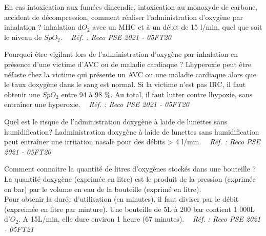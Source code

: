 \documentclass[grid,avery5371,landscape]{flashcards}
\makeatletter
\newcounter{nocarte}
\newcommand{\categ}[1]{%
  \def\@categ{#1}%
  \setcounter{nocarte}{0}%
}
\newcommand{\source}[1]{%
  \medskip
  \itshape%
   ~ \hfill Réf. : #1}
\makeatother
\begin{document}
\color[HTML]{003273}
\categ{PSE}
\begin{flashcard}[CAT]{
 En cas intoxication aux fumées dincendie, intoxication au monoxyde de carbone, accident de décompression, comment réaliser l'administration d'oxygène par inhalation ?   }
  inhalation d$O_2$ avec un MHC et à un débit de 15 l/min, quel que soit le niveau de $SpO_2$.
  \source{Reco PSE 2021 - 05FT20}
\end{flashcard}


\color[HTML]{003273}
\categ{PSE}
\begin{flashcard}[CAT]{
 Pourquoi être vigilant lors de l'administration d'oxygène par inhalation en présence d'une victime d'AVC ou de maladie cardiaque ?   }
  Lhyperoxie peut être néfaste chez la victime qui présente un AVC ou une maladie cardiaque alors que le taux doxygène dans le sang est normal. Si la victime n'est pas IRC, il faut obtenir une $SpO_2$ entre 94 à 98 \%. Au total, il faut lutter contre lhypoxie, sans entraîner une hyperoxie.
  \source{Reco PSE 2021 - 05FT20}
\end{flashcard}


\color[HTML]{003273}
\categ{PSE}
\begin{flashcard}[CAT]{
 Quel est le risque de l'administration doxygène à laide de lunettes sans humidification?   }
  Ladministration doxygène à laide de lunettes sans humidification peut entraîner une irritation nasale pour des débits > 4 l/min.
  \source{Reco PSE 2021 - 05FT20}
\end{flashcard}


\color[HTML]{003273}
\categ{PSE}
\begin{flashcard}[matériel]{
 Comment connaitre la quantité de litres d'oxygènes stockés dans une bouteille ?   }
  La quantité doxygène (exprimée en litre) est le produit de la pression (exprimée en bar) par le volume en eau de la bouteille (exprimé en litre). \\ Pour obtenir la durée d'utilisation (en minutes), il faut diviser par le débit (expreimée en litre par minture).
Une bouteille de 5L à 200 bar contient 1 000L d'$O_2$. A 15L/min, elle dure environ 1 heure (67 minutes).
  \source{Reco PSE 2021 - 05FT21}
\end{flashcard}
\end{document}
